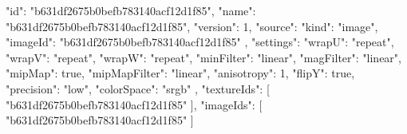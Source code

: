 {
  "id": "b631df2675b0befb783140acf12d1f85",
  "name": "b631df2675b0befb783140acf12d1f85",
  "version": 1,
  "source": {
    "kind": "image",
    "imageId": "b631df2675b0befb783140acf12d1f85"
  },
  "settings": {
    "wrapU": "repeat",
    "wrapV": "repeat",
    "wrapW": "repeat",
    "minFilter": "linear",
    "magFilter": "linear",
    "mipMap": true,
    "mipMapFilter": "linear",
    "anisotropy": 1,
    "flipY": true,
    "precision": "low",
    "colorSpace": "srgb"
  },
  "textureIds": [
    "b631df2675b0befb783140acf12d1f85"
  ],
  "imageIds": [
    "b631df2675b0befb783140acf12d1f85"
  ]
}
